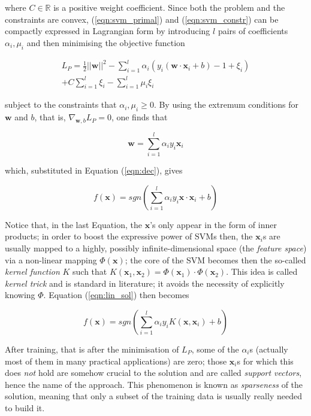 \documentclass[10pt,twocolumn,letterpaper]{article}
\def\RR{\mathbb{R}}
\def\xx{\mathbf{x}}
\def\ww{\mathbf{w}}
\begin{document}
where $C \in \RR$ is a positive weight coefficient. Since both the
problem and the constraints are convex, (\ref{eqn:svm_primal}) and
(\ref{eqn:svm_constr}) can be compactly expressed in Lagrangian form
by introducing $l$ pairs of coefficients $\alpha_i, \mu_i$ and then
minimising the objective function

\begin{eqnarray} \label{eqn:lp1}
  L_P =
      \frac{1}{2} ||\ww||^2
    - \sum_{i=1}^l \alpha_i \left(y_i (\ww\cdot\xx_i+b) - 1 + \xi_i \right) \\
    + C \sum_{i=1}^l \xi_i - \sum_{i=1}^l \mu_i \xi_i \nonumber
\end{eqnarray}

subject to the constraints that $\alpha_i,\mu_i\geq 0$. By using the
extremum conditions for $\ww$ and $b$, that is, $\nabla_{\ww,b} L_P =
0$, one finds that

\begin{equation} \label{eqn:w1}
  \ww = \sum_{i=1}^l \alpha_i y_i \xx_i
\end{equation}

which, substituted in Equation (\ref{eqn:dec}), gives

\begin{equation} \label{eqn:lin_sol}
  f(\xx) = sgn \left( \sum_{i=1}^l \alpha_i y_i \xx \cdot \xx_i + b \right)
\end{equation}

Notice that, in the last Equation, the $\xx$'s only appear in the form
of inner products; in order to boost the expressive power of SVMs
then, the $\xx_i$s are usually mapped to a highly, possibly
infinite-dimensional space (the \emph{feature space}) via a
non-linear mapping $\Phi(\xx)$; the core of the SVM becomes then the
so-called \emph{kernel function} $K$ such that $K(\xx_1,\xx_2) =
\Phi(\xx_1)\cdot\Phi(\xx_2)$. This idea is called \emph{kernel trick}
and is standard in literature; it avoids the necessity of explicitly
knowing $\Phi$. Equation (\ref{eqn:lin_sol}) then becomes

\begin{equation} \label{eqn:sol}
  f(\xx) = sgn \left( \sum_{i=1}^l \alpha_i y_i K(\xx,\xx_i) + b \right)
\end{equation}

After training, that is after the minimisation of $L_P$, some of the
$\alpha_i$s (actually most of them in many practical applications) are
zero; those $\xx_i$s for which this does \emph{not} hold are somehow
crucial to the solution and are called \emph{support vectors}, hence
the name of the approach. This phenomenon is known as
\emph{sparseness} of the solution, meaning that only a subset of the
training data is usually really needed to build it.
\end{document}
